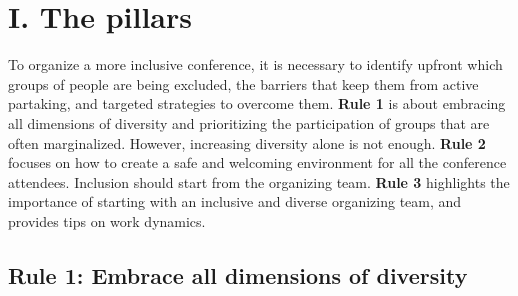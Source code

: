 \documentclass[10pt,letterpaper]{article}
\begin{document}
\section*{I. The pillars}

To organize a more inclusive conference, it is necessary to identify upfront which groups of people are being excluded, the barriers that keep them from active partaking, and targeted strategies to overcome them. 
\textbf{Rule 1} is about embracing all dimensions of diversity and prioritizing the participation of groups that are often marginalized.
However, increasing diversity alone is not enough. \textbf{Rule 2} focuses on how to create a safe and welcoming environment for all the conference attendees. 
Inclusion should start from the organizing team. \textbf{Rule 3} highlights the importance of starting with an inclusive and diverse organizing team, and provides tips on work dynamics.


\subsection*{Rule 1: Embrace all dimensions of diversity}
\label{rule_diversity}
\end{document}
